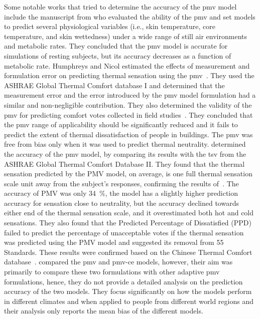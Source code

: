 Some notable works that tried to determine the accuracy of the \ac{pmv} model include the manuscript from  who evaluated the ability of the \ac{pmv} and \ac{set} models to predict several physiological variables (i.e., skin temperature, core temperature, and skin wettedness) under a wide range of still air environments and metabolic rates.
They concluded that the \ac{pmv} model is accurate for simulations of resting subjects, but its accuracy decreases as a function of metabolic rate.
Humphreys and Nicol estimated the effects of measurement and formulation error on predicting thermal sensation using the \ac{pmv}~\cite{Humphreys2000}.
They used the ASHRAE Global Thermal Comfort database I and determined that the measurement error and the error introduced by the \ac{pmv} model formulation had a similar and non-negligible contribution.
They also determined the validity of the \ac{pmv} for predicting comfort votes collected in field studies~\cite{Humphreys2002}.
They concluded that the \ac{pmv} range of applicability should be significantly reduced and it fails to predict the extent of thermal dissatisfaction of people in buildings.
The \ac{pmv} was free from bias only when it was used to predict thermal neutrality.
 determined the accuracy of the \ac{pmv} model, by comparing its results with the \ac{tsv} from the ASHRAE Global Thermal Comfort Database II.
They found that the thermal sensation predicted by the PMV model, on average, is one full thermal sensation scale unit away from the subject’s responses, confirming the results of~\cite{Humphreys2002}.
The accuracy of PMV was only \qty{34}{\percent}, the model has a slightly higher prediction accuracy for sensation close to neutrality, but the accuracy declined towards either end of the thermal sensation scale, and it overestimated both hot and cold sensations.
They also found that the Predicted Percentage of Dissatisfied (PPD) failed to predict the percentage of unacceptable votes if the thermal sensation was predicted using the PMV model and suggested its removal from \gls{55} Standards.
These results were confirmed based on the Chinese Thermal Comfort database~\cite{du_evaluation_2022}.
 compared the \ac{pmv} and \ac{pmv-ce} models, however, their aim was primarily to compare these two formulations with other adaptive \ac{pmv} formulations, hence, they do not provide a detailed analysis on the prediction accuracy of the two models.
They focus significantly on how the models perform in different climates and when applied to people from different world regions and their analysis only reports the mean bias of the different models.

